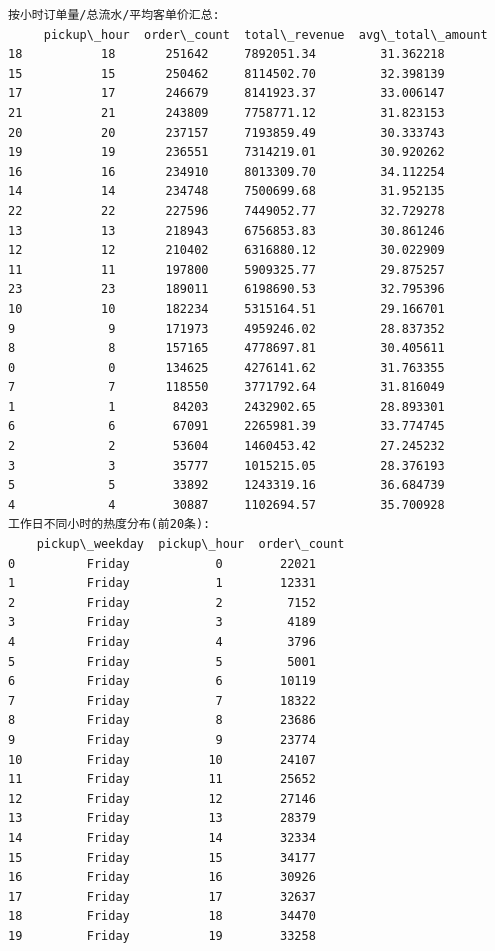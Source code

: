\documentclass[11pt]{article}
\begin{document}
    \begin{Verbatim}[commandchars=\\\{\}]
按小时订单量/总流水/平均客单价汇总:
     pickup\_hour  order\_count  total\_revenue  avg\_total\_amount
18           18       251642     7892051.34         31.362218
15           15       250462     8114502.70         32.398139
17           17       246679     8141923.37         33.006147
21           21       243809     7758771.12         31.823153
20           20       237157     7193859.49         30.333743
19           19       236551     7314219.01         30.920262
16           16       234910     8013309.70         34.112254
14           14       234748     7500699.68         31.952135
22           22       227596     7449052.77         32.729278
13           13       218943     6756853.83         30.861246
12           12       210402     6316880.12         30.022909
11           11       197800     5909325.77         29.875257
23           23       189011     6198690.53         32.795396
10           10       182234     5315164.51         29.166701
9             9       171973     4959246.02         28.837352
8             8       157165     4778697.81         30.405611
0             0       134625     4276141.62         31.763355
7             7       118550     3771792.64         31.816049
1             1        84203     2432902.65         28.893301
6             6        67091     2265981.39         33.774745
2             2        53604     1460453.42         27.245232
3             3        35777     1015215.05         28.376193
5             5        33892     1243319.16         36.684739
4             4        30887     1102694.57         35.700928
工作日不同小时的热度分布(前20条):
    pickup\_weekday  pickup\_hour  order\_count
0          Friday            0        22021
1          Friday            1        12331
2          Friday            2         7152
3          Friday            3         4189
4          Friday            4         3796
5          Friday            5         5001
6          Friday            6        10119
7          Friday            7        18322
8          Friday            8        23686
9          Friday            9        23774
10         Friday           10        24107
11         Friday           11        25652
12         Friday           12        27146
13         Friday           13        28379
14         Friday           14        32334
15         Friday           15        34177
16         Friday           16        30926
17         Friday           17        32637
18         Friday           18        34470
19         Friday           19        33258
    \end{Verbatim}
\end{document}
